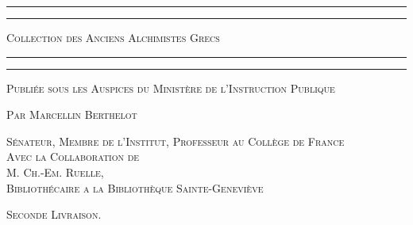 \documentclass[a4paper, 11pt, oneside, polutonikogreek, french]{article}
\begin{document}
\begin{titlepage} %
	\centering %

	
	\rule{\textwidth}{1.6pt}\vspace*{-\baselineskip}\vspace*{2pt} %
	\rule{\textwidth}{0.4pt} %
	
	\vspace{1\baselineskip} %
	
	{\scshape\Huge Collection des Anciens Alchimistes Grecs}
	
	\vspace{1\baselineskip} %

	\rule{\textwidth}{0.4pt}\vspace*{-\baselineskip}\vspace{3.2pt} %
	\rule{\textwidth}{1.6pt} %
	
	\vspace{1\baselineskip} %
	
	
	{\scshape \normalsize Publiée sous les Auspices du Ministère de l'Instruction Publique}
	
	{\scshape Par \Large Marcellin Berthelot} %
	
	\vspace*{1\baselineskip} %
	
        {\scshape\scriptsize Sénateur, Membre de l'Institut, Professeur au Collège de France \\Avec la Collaboration de \\\large M. Ch.-Em. Ruelle,\\\scriptsize Bibliothécaire a la Bibliothèque Sainte-Geneviève} %
  
        \vspace{4\baselineskip}
  
	{\scshape \normalsize Seconde Livraison.} %
  


\end{titlepage}
\end{document}

